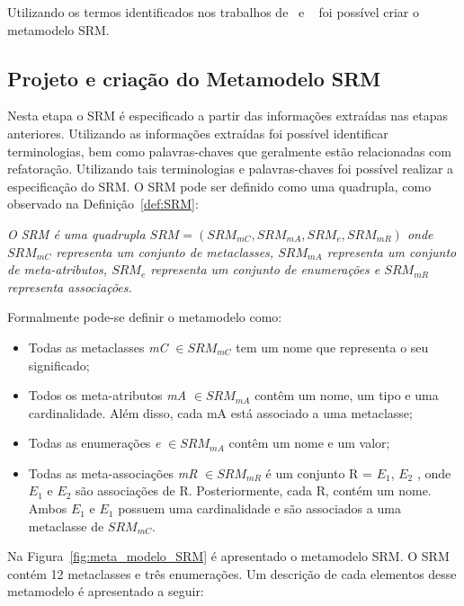 Utilizando os termos identificados nos trabalhos de~ e ~ foi possível criar o metamodelo SRM. 

\subsection{Projeto e criação do Metamodelo SRM}

Nesta etapa o SRM é especificado a partir das informações extraídas nas etapas anteriores. Utilizando as informações extraídas foi possível identificar terminologias, bem como palavras-chaves que geralmente estão relacionadas com refatoração. Utilizando tais terminologias e palavras-chaves foi possível realizar a especificação do SRM. O SRM pode ser definido como uma quadrupla, como observado na Definição~\ref{def:SRM}: 


\begin{definicao}\label{def:SRM}
    \textit{O SRM é uma quadrupla $SRM = (SRM_{mC}, SRM_{mA}, SRM_{e}, SRM_{mR})$ onde $SRM_{mC} $ representa um conjunto de metaclasses, $SRM_{mA}$ representa um conjunto de meta-atributos, $SRM_{e}$ representa um conjunto de enumerações e $SRM_{mR}$ representa associações.}
\end{definicao}

Formalmente pode-se definir o metamodelo como:

\begin{itemize}
	\item Todas as metaclasses \textit{mC} $\in SRM_{mC}$ tem um nome que representa o seu significado;
	\item Todos os meta-atributos \textit{mA} $\in SRM_{mA}$ contêm um nome, um tipo e uma cardinalidade. Além disso, cada mA está associado a uma metaclasse;
	\item Todas as enumerações \textit{e} $\in SRM_{mA}$ contêm um nome e um valor;
	\item Todas as meta-associações \textit{mR} $\in SRM_{mR}$ é um conjunto R = $E_{1}$, $E_{2}$  , onde  $E_{1}$ e $E_{2}$ são associações de R. Posteriormente, cada R, contém um nome. Ambos $E_{1}$  e $E_{1}$ possuem uma cardinalidade e são associados a uma metaclasse de $SRM_{mC}$.
\end{itemize}

Na Figura~\ref{fig:meta_modelo_SRM} é apresentado o metamodelo SRM. O SRM contém 12 metaclasses e três enumerações. Um descrição de cada elementos desse metamodelo é apresentado a seguir:

